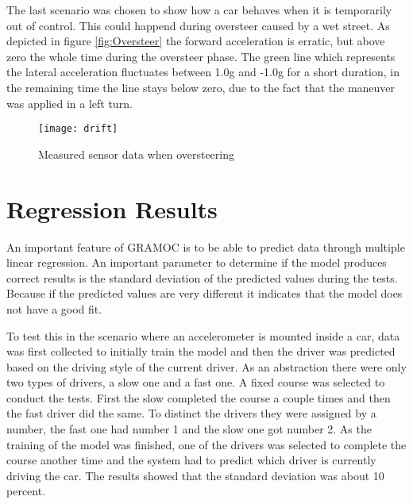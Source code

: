 The last scenario was chosen to show how a car behaves when it is temporarily out of control. This could happend during oversteer caused by a wet street. As depicted in figure \vref{fig:Oversteer} the forward acceleration is erratic, but above zero the whole time during the oversteer phase. The green line which represents the lateral acceleration fluctuates between 1.0g and -1.0g for a short duration, in the remaining time the line stays below zero, due to the fact that the maneuver was applied in a left turn.

\begin{figure}[h]
    \centering
    \texttt{[image: drift]}
    \caption{Measured sensor data when oversteering}
    \label{fig:Oversteer}
\end{figure}

\section{Regression Results}




An important feature of GRAMOC is to be able to predict data through multiple linear regression. An important parameter to determine if the model produces correct results is the standard deviation of the predicted values during the tests. Because if the predicted values are very different it indicates that the model does not have a good fit.


To test this in the scenario where an accelerometer is mounted inside a car, data was first collected to initially train the model and then the driver was predicted based on the driving style of the current driver. As an abstraction there were only two types of drivers, a slow one and a fast one. A fixed course was selected to conduct the tests. First the slow completed the course a couple times and then the fast driver did the same. To distinct the drivers they were assigned by a number, the fast one had number 1 and the slow one got number 2. As the training of the model was finished, one of the drivers was selected to complete the course another time and the system had to predict which driver is currently driving the car. The results showed that the standard deviation was about 10 percent.
